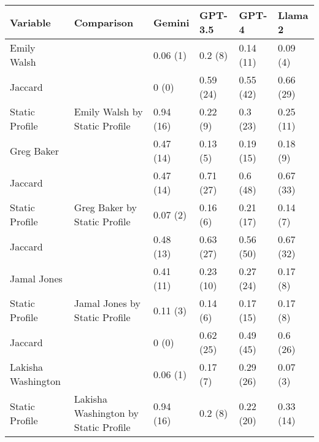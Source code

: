 
\begin{tabular}{llllll}
\toprule
Variable & Comparison & Gemini & GPT-3.5 & GPT-4 & Llama 2\\
\midrule
Emily Walsh &  & 0.06 (1) & 0.2 (8) & 0.14 (11) & 0.09 (4)\\

Jaccard &  & 0 (0) & 0.59 (24) & 0.55 (42) & 0.66 (29)\\

Static Profile & \multirow{-3}{*}{\raggedright\arraybackslash Emily Walsh by Static Profile} & 0.94 (16) & 0.22 (9) & 0.3 (23) & 0.25 (11)\\
\cmidrule{1-6}
Greg Baker &  & 0.47 (14) & 0.13 (5) & 0.19 (15) & 0.18 (9)\\

Jaccard &  & 0.47 (14) & 0.71 (27) & 0.6 (48) & 0.67 (33)\\

Static Profile & \multirow{-3}{*}{\raggedright\arraybackslash Greg Baker by Static Profile} & 0.07 (2) & 0.16 (6) & 0.21 (17) & 0.14 (7)\\
\cmidrule{1-6}
Jaccard &  & 0.48 (13) & 0.63 (27) & 0.56 (50) & 0.67 (32)\\

Jamal Jones &  & 0.41 (11) & 0.23 (10) & 0.27 (24) & 0.17 (8)\\

Static Profile & \multirow{-3}{*}{\raggedright\arraybackslash Jamal Jones by Static Profile} & 0.11 (3) & 0.14 (6) & 0.17 (15) & 0.17 (8)\\
\cmidrule{1-6}
Jaccard &  & 0 (0) & 0.62 (25) & 0.49 (45) & 0.6 (26)\\

Lakisha Washington &  & 0.06 (1) & 0.17 (7) & 0.29 (26) & 0.07 (3)\\

Static Profile & \multirow{-3}{*}{\raggedright\arraybackslash Lakisha Washington by Static Profile} & 0.94 (16) & 0.2 (8) & 0.22 (20) & 0.33 (14)\\
\bottomrule
\end{tabular}
